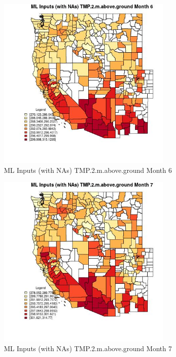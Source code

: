 \begin{figure} 
\centering  
\includegraphics[width=0.77\textwidth]{Code_Outputs/Report_ML_input_PM25_Step4_part_f_de_duplicated_aves_prioritize_24hr_obswNAs_CountyTMP2mabovegroundmedianMonth6.jpg} 
\caption{\label{fig:Report_ML_input_PM25_Step4_part_f_de_duplicated_aves_prioritize_24hr_obswNAsCountyTMP2mabovegroundmedianMonth6}ML Inputs (with NAs) TMP.2.m.above.ground Month 6} 
\end{figure} 
 

\begin{figure} 
\centering  
\includegraphics[width=0.77\textwidth]{Code_Outputs/Report_ML_input_PM25_Step4_part_f_de_duplicated_aves_prioritize_24hr_obswNAs_CountyTMP2mabovegroundmedianMonth7.jpg} 
\caption{\label{fig:Report_ML_input_PM25_Step4_part_f_de_duplicated_aves_prioritize_24hr_obswNAsCountyTMP2mabovegroundmedianMonth7}ML Inputs (with NAs) TMP.2.m.above.ground Month 7} 
\end{figure} 
 

